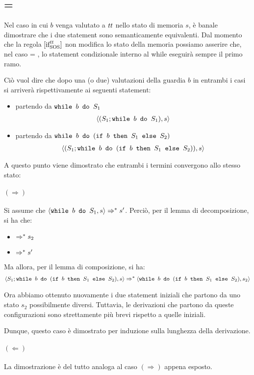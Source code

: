 \subsection{ = \semtrue}

Nel caso in cui $b$ venga valutato a $\semtrue$ nello stato di memoria $s$, è
banale dimostrare che i due statement sono semanticamente equivalenti. Dal 
momento che la regola $\ifttSOS{}$ non modifica lo stato della memoria
possiamo asserire che, nel caso  = \semtrue, lo 
statement condizionale interno al while eseguirà sempre il primo ramo.

Ciò vuol dire che dopo una (o due) valutazioni della guardia $b$ in entrambi i
casi si arriverà rispettivamente ai seguenti statement:
\begin{itemize}
  \item partendo da $\wbS{b}{S_1}$
\begin{align*}
\confSs{(S_1;\wbS{b}{S_1})}{s}
\end{align*}
  \item partendo da $\wbS{b}{(\ifABC{b}{S_1}{S_2})}$
\begin{align*}
\confSs{(S_1; \wbS{b}{(\ifABC{b}{S_1}{S_2})})}{s}
\end{align*}
\end{itemize}

A questo punto viene dimostrato che entrambi i termini convergono allo stesso
stato:

\paragraph{$(\Rightarrow)$}

Si assume che $\confSs{\wbS{b}{S_1}}{s} \Rar{*} s'$.
Perciò, per il lemma di decomposizione, si ha che:

\begin{itemize}
  \item {} $\Rar{*} s_2$
  \item {} $\Rar{*} s'$
\end{itemize}

Ma allora, per il lemma di composizione, si ha:
\begin{align*}
\confSs{S_1; \wbS{b}{(\ifABC{b}{S_1}{S_2})}}{s}
\Rar{*}
\confSs{\wbS{b}{(\ifABC{b}{S_1}{S_2})}}{s_2}
\end{align*}

Ora abbiamo ottenuto nuovamente i due statement iniziali che partono da uno
stato $s_2$ possibilmente diversi. Tuttavia, le derivazioni che partono da
queste configurazioni sono strettamente più brevi rispetto a quelle iniziali.

Dunque, questo caso è dimostrato per induzione sulla lunghezza della
derivazione.

\paragraph{$(\Leftarrow)$}

La dimostrazione è del tutto analoga al caso $(\Rightarrow)$ appena esposto.

